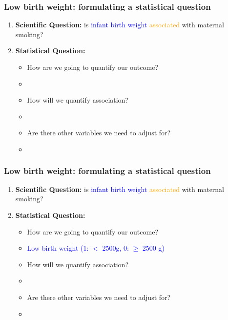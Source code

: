 \documentclass[12pt, 
hyperref={colorlinks=true, linkcolor=blue, urlcolor=cyan}]{beamer}
\begin{document}
\begin{frame}
\frametitle{Low birth weight: formulating a statistical question}
\begin{enumerate}
\item \textbf{Scientific Question:} is \textcolor{blue}{infant birth weight} \textcolor{orange}{associated} with maternal smoking?
\item \textbf{Statistical Question:} 
	\begin{itemize}
	\item How are we going to quantify our outcome?
	\item[]
	\item How will we quantify association?
	\item[]
	\item Are there other variables we need to adjust for?
	\item[]
	\end{itemize}
\end{enumerate}

\end{frame}

\begin{frame}[noframenumbering]
\frametitle{Low birth weight: formulating a statistical question}
\begin{enumerate}
\item \textbf{Scientific Question:} is \textcolor{blue}{infant birth weight} \textcolor{orange}{associated} with maternal smoking?
\item \textbf{Statistical Question:} 
	\begin{itemize}
	\item How are we going to quantify our outcome?
	\item[] \textcolor{blue}{Low birth weight (1: $<$ 2500g, 0: $\ge$ 2500 g)}
	\item How will we quantify association?
	\item[]
	\item Are there other variables we need to adjust for?
	\item[]
	\end{itemize}
\end{enumerate}
\end{frame}
\end{document}
